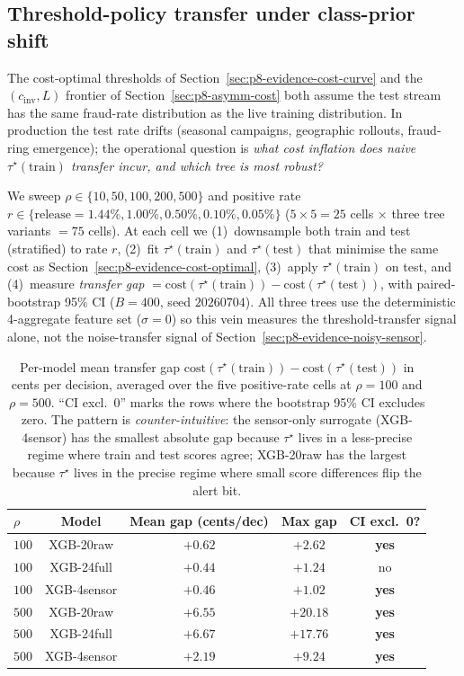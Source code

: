 \documentclass{article}
\providecommand{\secref}[1]{Section~\ref{#1}}
\begin{document}
\subsection{Threshold-policy transfer under class-prior shift}
\label{sec:p8-threshold-transfer}

The cost-optimal thresholds of \secref{sec:p8-evidence-cost-curve} and the
$(c_\text{inv}, L)$ frontier of \secref{sec:p8-asymm-cost} both assume the
test stream has the same fraud-rate distribution as the live training
distribution. In production the test rate drifts (seasonal campaigns,
geographic rollouts, fraud-ring emergence); the operational question is
\emph{what cost inflation does naive $\tau^\star(\mathrm{train})$ transfer incur, and
which tree is most robust?}

We sweep $\rho \in \{10, 50, 100, 200, 500\}$ and positive rate
$r \in \{\text{release}{=}1.44\%, 1.00\%, 0.50\%, 0.10\%, 0.05\%\}$
($5 \times 5 = 25$ cells $\times$ three tree variants $= 75$ cells). At each
cell we (1)~downsample both train and test (stratified) to rate $r$,
(2)~fit $\tau^\star(\text{train})$ and $\tau^\star(\text{test})$ that minimise
the same cost as \secref{sec:p8-evidence-cost-optimal}, (3)~apply
$\tau^\star(\text{train})$ on test, and (4)~measure
\emph{transfer gap} $= \text{cost}(\tau^\star(\text{train})) -
\text{cost}(\tau^\star(\text{test}))$, with paired-bootstrap 95\% CI
($B{=}400$, seed $20260704$). All three trees use the deterministic
4-aggregate feature set ($\sigma{=}0$) so this vein measures the
threshold-transfer signal alone, not the noise-transfer signal of
\secref{sec:p8-evidence-noisy-sensor}.

\begin{table}[t]
\centering\small
\caption{Per-model mean transfer gap $\text{cost}(\tau^\star(\text{train}))
- \text{cost}(\tau^\star(\text{test}))$ in cents per decision, averaged over
the five positive-rate cells at $\rho{=}100$ and $\rho{=}500$.
``CI excl.\ 0'' marks the rows where the bootstrap 95\% CI excludes
zero. The pattern is \emph{counter-intuitive}: the sensor-only
surrogate (XGB-4sensor) has the smallest absolute gap because
$\tau^\star$ lives in a less-precise regime where train and test scores
agree; XGB-20raw has the largest because $\tau^\star$ lives in the
precise regime where small score differences flip the alert bit.}
\label{tab:p8-threshold-transfer}
\begin{tabular}{lcccc}
\toprule
$\rho$ & Model & Mean gap (cents/dec) & Max gap & CI excl.\ 0? \\
\midrule
$100$ & XGB-20raw   & $+0.62$ & $+2.62$ & \textbf{yes} \\
$100$ & XGB-24full  & $+0.44$ & $+1.24$ & no \\
$100$ & XGB-4sensor & $+0.46$ & $+1.02$ & \textbf{yes} \\
\midrule
$500$ & XGB-20raw   & $+6.55$ & $+20.18$ & \textbf{yes} \\
$500$ & XGB-24full  & $+6.67$ & $+17.76$ & \textbf{yes} \\
$500$ & XGB-4sensor & $+2.19$ & $+9.24$  & \textbf{yes} \\
\bottomrule
\end{tabular}
\end{table}
\end{document}
